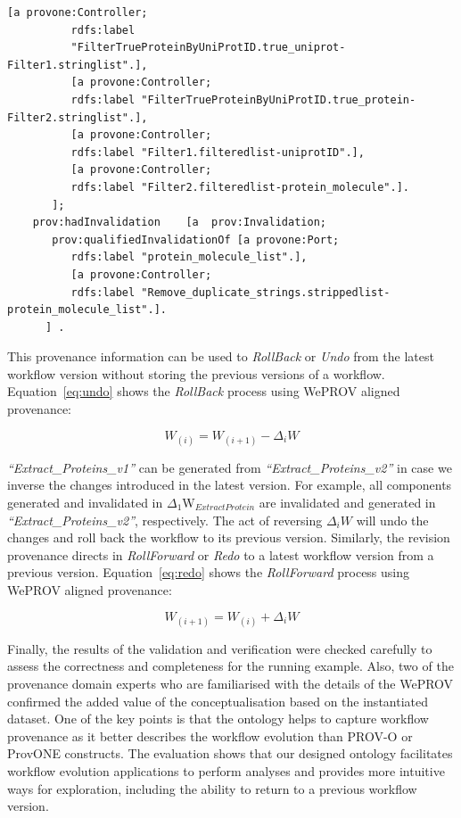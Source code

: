 \documentclass[ao]{iosart2x}
\begin{document}
\begin{lstlisting}[frame=single, caption={Extract\_Proteins workflow revision provenance},label={lst:modification-prov}]
          [a provone:Controller;
          rdfs:label
          "FilterTrueProteinByUniProtID.true_uniprot-Filter1.stringlist".],
          [a provone:Controller;
          rdfs:label "FilterTrueProteinByUniProtID.true_protein-Filter2.stringlist".],
          [a provone:Controller;
          rdfs:label "Filter1.filteredlist-uniprotID".],
          [a provone:Controller;
          rdfs:label "Filter2.filteredlist-protein_molecule".].
       ];
    prov:hadInvalidation    [a  prov:Invalidation;
       prov:qualifiedInvalidationOf [a provone:Port;
          rdfs:label "protein_molecule_list".],
          [a provone:Controller;
          rdfs:label "Remove_duplicate_strings.strippedlist-protein_molecule_list".].
      ] .
\end{lstlisting}

This provenance information can be used to \textit{RollBack} or \textit{Undo} from the latest workflow version without storing the previous versions of a workflow. 
Equation~\ref{eq:undo} shows the \textit{RollBack} process using WePROV aligned provenance:

\begin{equation}
\label{eq:undo}
    W_{(i)} = W_{(i+1)} - \Delta_iW
\end{equation}

\textit{``Extract\_Proteins\_v1''} can be generated from \textit{``Extract\_Proteins\_v2''} in case we inverse the changes introduced in the latest version. For example, all components generated and invalidated in $\Delta_1$W$_{ExtractProtein}$ are invalidated and generated in \textit{``Extract\_Proteins\_v2''}, respectively. The act of reversing $\Delta_iW$  will undo the changes and roll back the workflow to its previous version. 
Similarly, the revision provenance directs in \textit{RollForward} or \textit{Redo} to a latest workflow version from a previous version. Equation~\ref{eq:redo} shows the \textit{RollForward} process using WePROV aligned provenance:

\begin{equation}
\label{eq:redo}
    W_{(i+1)} = W_{(i)} + \Delta_iW
\end{equation}

Finally, the results of the validation and verification were checked carefully to assess the correctness and completeness for the running example.  
Also, two of the provenance domain experts who are familiarised with the details of the WePROV confirmed the added value of the conceptualisation based on the instantiated dataset. 
One of the key points is that the ontology helps to capture workflow provenance as it better describes the workflow evolution than PROV-O or ProvONE constructs. The evaluation shows that our designed ontology facilitates workflow evolution applications to perform analyses and provides more intuitive ways for exploration, including the ability to return to a previous workflow version.
\end{document}
